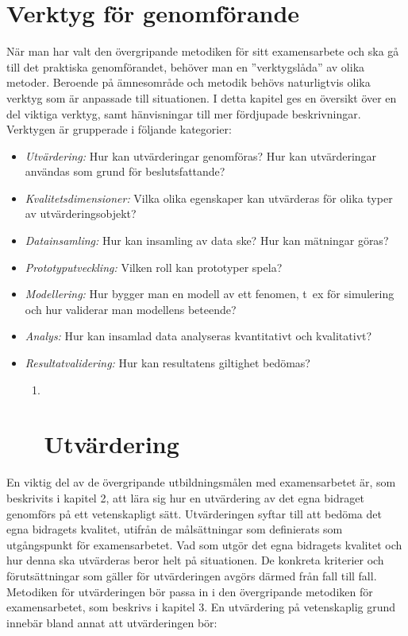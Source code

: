 \section{Verktyg för genomförande}\label{verktyg-fuxf6r-genomfuxf6rande}

När man har valt den övergripande metodiken för sitt examensarbete och
ska gå till det praktiska genomförandet, behöver man en ''verktygslåda''
av olika metoder. Beroende på ämnesområde och metodik behövs
naturligtvis olika verktyg som är anpassade till situationen. I detta
kapitel ges en översikt över en del viktiga verktyg, samt hänvisningar
till mer fördjupade beskrivningar. Verktygen är grupperade i följande
kategorier:

\begin{itemize}
\item
  \emph{Utvärdering:} Hur kan utvärderingar genomföras? Hur kan
  utvärderingar användas som grund för beslutsfattande?
\item
  \emph{Kvalitetsdimensioner:} Vilka olika egenskaper kan utvärderas för
  olika typer av utvärderingsobjekt?
\item
  \emph{Datainsamling:} Hur kan insamling av data ske? Hur kan mätningar
  göras?
\item
  \emph{Prototyputveckling:} Vilken roll kan prototyper spela?
\item
  \emph{Modellering:} Hur bygger man en modell av ett fenomen, t~ex för
  simulering och hur validerar man modellens beteende?
\item
  \emph{Analys:} Hur kan insamlad data analyseras kvantitativt och
  kvalitativt?
\item
  \emph{Resultatvalidering:} Hur kan resultatens giltighet bedömas?

  \begin{enumerate}
  \def\labelenumi{\arabic{enumi}.}
  \item ~
    \section{Utvärdering}\label{utvuxe4rdering}
  \end{enumerate}
\end{itemize}

En viktig del av de övergripande utbildningsmålen med examensarbetet är,
som beskrivits i kapitel 2, att lära sig hur en utvärdering av det egna
bidraget genomförs på ett vetenskapligt sätt. Utvärderingen syftar till
att bedöma det egna bidragets kvalitet, utifrån de målsättningar som
definierats som utgångspunkt för examensarbetet. Vad som utgör det egna
bidragets kvalitet och hur denna ska utvärderas beror helt på
situationen. De konkreta kriterier och förutsättningar som gäller för
utvärderingen avgörs därmed från fall till fall. Metodiken för
utvärderingen bör passa in i den övergripande metodiken för
examensarbetet, som beskrivs i kapitel 3. En utvärdering på vetenskaplig
grund innebär bland annat att utvärderingen bör:

